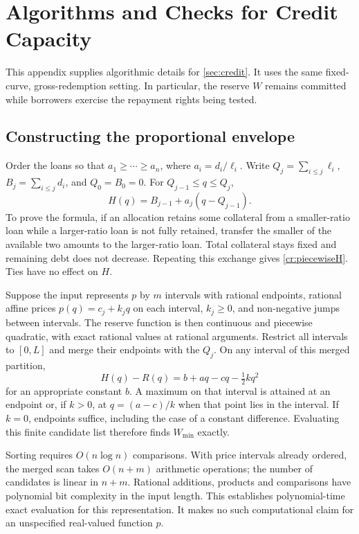 \section{Algorithms and Checks for Credit Capacity}\label{cr:appendix}

This appendix supplies algorithmic details for \cref{sec:credit}. It uses the same fixed-curve, gross-redemption setting. In particular, the reserve $W$ remains committed while borrowers exercise the repayment rights being tested.

\subsection{Constructing the proportional envelope}\label{cr:algorithm}

Order the loans so that $a_1\ge\cdots\ge a_n$, where $a_i=d_i/\ell_i$. Write $Q_j=\sum_{i\le j}\ell_i$, $B_j=\sum_{i\le j}d_i$, and $Q_0=B_0=0$. For $Q_{j-1}\le q\le Q_j$,
\begin{equation}\label{cr:piecewiseH}
H(q)=B_{j-1}+a_j(q-Q_{j-1}).
\end{equation}
To prove the formula, if an allocation retains some collateral from a smaller-ratio loan while a larger-ratio loan is not fully retained, transfer the smaller of the available two amounts to the larger-ratio loan. Total collateral stays fixed and remaining debt does not decrease. Repeating this exchange gives \eqref{cr:piecewiseH}. Ties have no effect on $H$.

Suppose the input represents $p$ by $m$ intervals with rational endpoints, rational affine prices $p(q)=c_j+k_jq$ on each interval, $k_j\ge0$, and non-negative jumps between intervals. The reserve function is then continuous and piecewise quadratic, with exact rational values at rational arguments. Restrict all intervals to $[0,L]$ and merge their endpoints with the $Q_j$. On any interval of this merged partition,
\[
H(q)-R(q)=b+aq-cq-\tfrac12 kq^2
\]
for an appropriate constant $b$. A maximum on that interval is attained at an endpoint or, if $k>0$, at $q=(a-c)/k$ when that point lies in the interval. If $k=0$, endpoints suffice, including the case of a constant difference. Evaluating this finite candidate list therefore finds $W_{\min}$ exactly.

Sorting requires $O(n\log n)$ comparisons. With price intervals already ordered, the merged scan takes $O(n+m)$ arithmetic operations; the number of candidates is linear in $n+m$. Rational additions, products and comparisons have polynomial bit complexity in the input length. This establishes polynomial-time exact evaluation for this representation. It makes no such computational claim for an unspecified real-valued function $p$.

